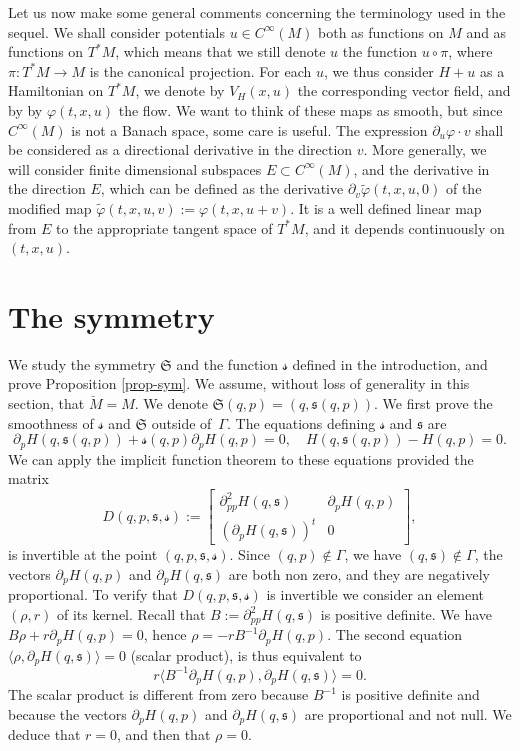 \documentclass[10pt]{amsart}
\newcommand{\gs}{\ensuremath{\mathfrak{s}}}
\newcommand{\gS}{\ensuremath{\mathfrak{S}}}
\newcommand{\ms}{\ensuremath{\mathscr{s}}}
\theoremstyle{plain}
\theoremstyle{definition}
\begin{document}
Let us now make some general comments concerning the terminology used in the sequel.
We shall consider potentials $u\in C^{\infty}(M)$ both as functions on $M$ and as functions on $T^*M$, which means that we
still denote $u$ the function $u\circ \pi$, where $\pi:T^*M\to M$ is the canonical projection.
For each $u$, we thus consider $H+u$ as a Hamiltonian on $T^*M$, we denote by $V_H(x,u)$ the corresponding vector field, and by
by $\varphi(t,x,u)$ the flow. We want to think of these maps as smooth, but since $C^{\infty}(M)$ is not a Banach space, some care is useful. The expression $\partial_u \varphi \cdot v$ shall be considered as a directional
derivative in the direction $v$. More generally, we will consider finite dimensional subspaces $E\subset C^{\infty}(M)$,
and the derivative in the direction $E$, which can be defined as the derivative $\partial_v \tilde \varphi(t,x,u,0)$
of the modified map $\tilde \varphi(t,x,u,v):=\varphi(t,x,u+v)$. It is a well defined linear map from $E$ to the appropriate tangent space of $T^*M$, and it depends continuously on $(t,x,u)$.

\section{The symmetry}\label{sec-sym}

We study the symmetry $\gS$ and the function $\ms$ defined in the introduction, and prove Proposition \ref{prop-sym}.
We assume, without loss of generality in this section, that $\breve M=M$.
We denote $\gS(q,p)=(q,\gs(q,p))$.
We first prove the smoothness of $\ms$ and $\gS$ outside of~$\Gamma$. The equations defining $\ms$ and $\gs$ are
\[
\partial_pH (q, \gs(q,p))+\ms(q,p)\partial_pH(q,p)=0, \quad H(q,\gs(q,p))-H(q,p)=0.
\]
We can apply the implicit function theorem to these equations provided the matrix
\[
D(q,p,\gs,\ms):=\begin{bmatrix}
\partial^2_{pp}H(q, \gs) & \partial_pH(q, p)\\ (\partial_pH(q,\gs))^t& 0
\end{bmatrix},
\]
is invertible at the point $(q,p,\gs,\ms)$.
Since $(q,p)\not \in \Gamma$, we have $(q,\gs)\not \in \Gamma$, the vectors
$
\partial_pH(q,p)$
and
$\partial_pH(q,\gs)$
are both non zero, and they are negatively proportional.
To verify that $D(q,p,\gs, \ms)$ is invertible we consider an element
$(\rho, r)$ of its kernel. Recall that $B:= \partial^2_{pp}H(q,\gs)$ is positive definite.
We have $B\rho+r\partial_pH(q,p)=0$, hence $\rho=-rB^{-1}\partial_pH(q,p)$.
The second equation
$\langle \rho, \partial_p H(q,\gs)\rangle =0$ (scalar product),
is thus equivalent to
\[
r\langle B^{-1}\partial_pH(q,p), \partial_pH(q,\gs)\rangle =0.
\]
The scalar product is different from zero because $B^{-1}$ is positive definite and because the vectors $\partial_pH(q,p)$ and $\partial_pH(q,\gs)$ are proportional and not null. We deduce that $r=0$, and then that $\rho=0$.
\end{document}

